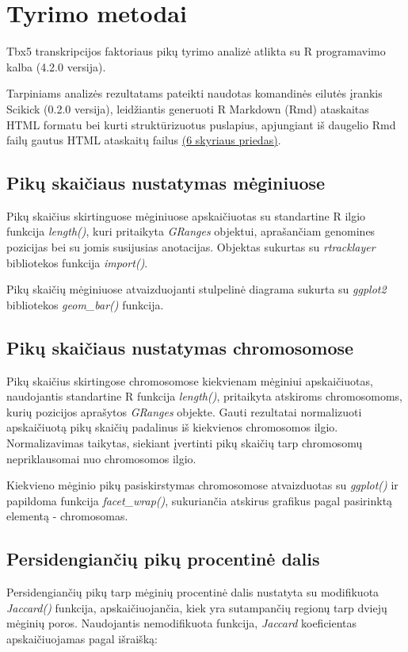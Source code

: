 \documentclass[12pt]{article}
\begin{document}

\section{Tyrimo metodai}
Tbx5 transkripcijos faktoriaus pikų tyrimo analizė atlikta su R programavimo
kalba\cite{R} (4.2.0 versija).

Tarpiniams analizės rezultatams pateikti naudotas komandinės eilutės įrankis
Scikick\cite{SCIK} (0.2.0 versija), leidžiantis generuoti R Markdown (Rmd)
ataskaitas HTML formatu bei kurti struktūrizuotus puslapius, apjungiant
iš daugelio Rmd failų gautus HTML ataskaitų failus
\hyperref[Priedas]{(6 skyriaus priedas)}.

\subsection{Pikų skaičiaus nustatymas mėginiuose}
Pikų skaičius skirtinguose mėginiuose apskaičiuotas su
standartine R ilgio funkcija \emph{length()}, kuri pritaikyta \emph{GRanges}
objektui, aprašančiam genomines pozicijas bei su jomis susijusias anotacijas.
Objektas sukurtas su \emph{rtracklayer}\cite{R_TRACK} bibliotekos funkcija
\emph{import()}.

Pikų skaičių mėginiuose atvaizduojanti stulpelinė diagrama sukurta su
\emph{ggplot2}\cite{R_GGPLOT} bibliotekos \emph{geom\_bar()} funkcija.

\subsection{Pikų skaičiaus nustatymas chromosomose}
Pikų skaičius skirtingose chromosomose kiekvienam
mėginiui apskaičiuotas, naudojantis standartine R funkcija \emph{length()},
pritaikyta atskiroms chromosomoms, kurių pozicijos aprašytos \emph{GRanges}
objekte. Gauti rezultatai normalizuoti apskaičiuotą pikų skaičių padalinus
iš kiekvienos chromosomos ilgio. Normalizavimas taikytas, siekiant įvertinti
pikų skaičių tarp chromosomų nepriklausomai nuo chromosomos ilgio.

Kiekvieno mėginio pikų pasiskirstymas
chromosomose atvaizduotas su \emph{ggplot()} ir papildoma funkcija
\emph{facet\_wrap()}, sukuriančia atskirus grafikus pagal pasirinktą elementą -
chromosomas.

\subsection{Persidengiančių pikų procentinė dalis}
Persidengiančių pikų tarp mėginių procentinė dalis nustatyta su modifikuota
\emph{Jaccard()} funkcija, apskaičiuojančia, kiek yra sutampančių regionų tarp
dviejų mėginių poros. Naudojantis nemodifikuota funkcija, \emph{Jaccard}
koeficientas apskaičiuojamas pagal išraišką:
\end{document}
